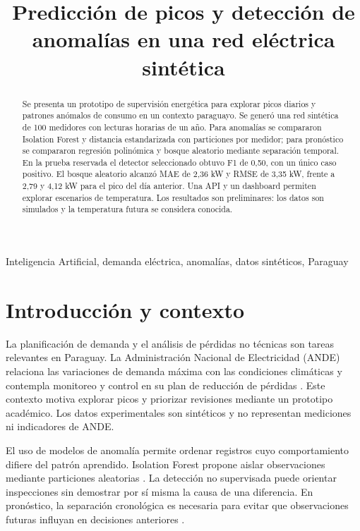 \documentclass[conference]{IEEEtran}
\begin{document}
\title{Predicción de picos y detección de anomalías en una red eléctrica sintética}
\author{}
\maketitle
\begin{abstract}
Se presenta un prototipo de supervisión energética para explorar picos diarios y patrones anómalos de consumo en un contexto paraguayo. Se generó una red sintética de 100 medidores con lecturas horarias de un año. Para anomalías se compararon Isolation Forest y distancia estandarizada con particiones por medidor; para pronóstico se compararon regresión polinómica y bosque aleatorio mediante separación temporal. En la prueba reservada el detector seleccionado obtuvo F1 de 0,50, con un único caso positivo. El bosque aleatorio alcanzó MAE de 2,36 kW y RMSE de 3,35 kW, frente a 2,79 y 4,12 kW para el pico del día anterior. Una API y un dashboard permiten explorar escenarios de temperatura. Los resultados son preliminares: los datos son simulados y la temperatura futura se considera conocida.
\end{abstract}
\begin{IEEEkeywords}
Inteligencia Artificial, demanda eléctrica, anomalías, datos sintéticos, Paraguay
\end{IEEEkeywords}
\section{Introducción y contexto}
La planificación de demanda y el análisis de pérdidas no técnicas son tareas relevantes en Paraguay. La Administración Nacional de Electricidad (ANDE) relaciona las variaciones de demanda máxima con las condiciones climáticas \cite{ande_demanda} y contempla monitoreo y control en su plan de reducción de pérdidas \cite{ande_perdidas}. Este contexto motiva explorar picos y priorizar revisiones mediante un prototipo académico. Los datos experimentales son sintéticos y no representan mediciones ni indicadores de ANDE.

El uso de modelos de anomalía permite ordenar registros cuyo comportamiento difiere del patrón aprendido. Isolation Forest propone aislar observaciones mediante particiones aleatorias \cite{liu}. La detección no supervisada puede orientar inspecciones sin demostrar por sí misma la causa de una diferencia. En pronóstico, la separación cronológica es necesaria para evitar que observaciones futuras influyan en decisiones anteriores \cite{crossvalidation}.
\end{document}

